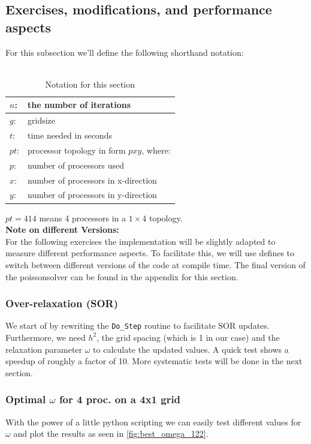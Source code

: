 \subsection{Exercises, modifications, and performance aspects}
For this subsection we'll define the following shorthand notation: \\
\\
\begin{table}[h!]
    \centering
    \begin{tabular}{|l|l|}
        \hline
        $n$:  &the number of iterations\\\hline
        $g$:  &gridsize\\\hline
        $t$:  &time needed in seconds\\\hline
        $pt$: & processor topology in form $pxy$, where:\\
        $p$:  &number of processors used\\
        $x$:  &number of processors in x-direction\\
        $y$:  &number of processors in y-direction\\\hline
       \end{tabular}
    \caption{Notation for this section}
\end{table}
$pt = 414$ means 4 processors in a $1\times 4$ topology. \\

\textbf{Note on different Versions:}\\
For the following exercises the implementation will be slightly adapted to measure different performance aspects. To facilitate this, we will use defines to switch between different versions of the code at compile time. The final version of the poissonsolver can be found in the appendix for this section.

\subsubsection{Over-relaxation (SOR)}
We start of by rewriting the \texttt{Do\_Step} routine to facilitate SOR updates. Furthermore, we need $h^2$, the grid spacing (which is 1 in our case) and the relaxation parameter $\omega$ to calculate the updated values. A quick test shows a speedup of roughly a factor of 10. More systematic tests will be done in the next section.
\subsubsection{Optimal $\omega$ for 4 proc. on a 4x1 grid}
With the power of a little python scripting we can easily test different values for $\omega$ and plot the results as seen in \autoref{fig:best_omega_122}. 

